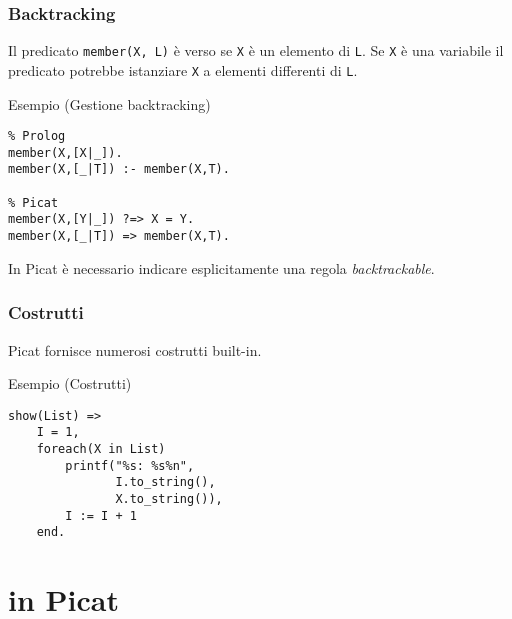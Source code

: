 \documentclass{beamer}
\begin{document}

\begin{frame}[fragile]
  \frametitle{Backtracking} 
  Il predicato \texttt{member(X, L)} è verso se \texttt{X} è un elemento di \texttt{L}. Se \texttt{X} è una variabile il predicato potrebbe istanziare \texttt{X} a elementi differenti di \texttt{L}.
  
  \begin{exampleblock}{Esempio (Gestione backtracking)}
\begin{verbatim}
% Prolog 
member(X,[X|_]).
member(X,[_|T]) :- member(X,T).

% Picat
member(X,[Y|_]) ?=> X = Y.
member(X,[_|T]) => member(X,T).
\end{verbatim}
  \end{exampleblock}
  In Picat è necessario indicare esplicitamente una regola \emph{backtrackable}.
\end{frame}


\begin{frame}[fragile]
  \frametitle{Costrutti} 
  Picat fornisce numerosi costrutti built-in.
  \begin{exampleblock}{Esempio (Costrutti)}
\begin{verbatim}
show(List) =>
    I = 1,
    foreach(X in List)
        printf("%s: %s%n", 
               I.to_string(), 
               X.to_string()),
        I := I + 1
    end.
\end{verbatim}
  \end{exampleblock}
\end{frame}


\section{\lset{} in Picat}
\end{document}
